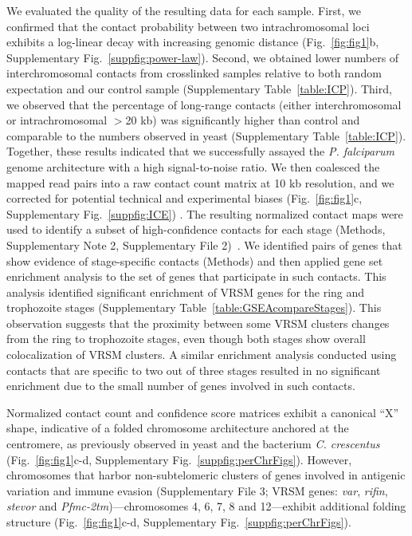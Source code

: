 We evaluated the quality of the resulting data for each sample. First, we confirmed that the contact probability between two intrachromosomal loci exhibits a log-linear decay with increasing genomic distance (Fig.~\ref{fig:fig1}b, Supplementary Fig.~\ref*{suppfig:power-law}). Second, we obtained lower numbers of interchromosomal contacts from crosslinked samples relative to both random expectation and our control sample (Supplementary Table~\ref*{table:ICP}). Third, we observed that the percentage of long-range contacts (either interchromosomal or intrachromosomal $>$20 kb) was significantly higher than control and comparable to the numbers observed in yeast \citep{duan:three} (Supplementary Table~\ref*{table:ICP}). Together, these results indicated that we successfully assayed the {\em P. falciparum} genome architecture with a high signal-to-noise ratio. We then coalesced the mapped read pairs into a raw contact count matrix at 10 kb resolution, and we corrected for potential technical and experimental biases \citep{imakaev:iterative} (Fig.~\ref{fig:fig1}c, Supplementary Fig.~\ref*{suppfig:ICE}) . The resulting normalized contact maps were used to identify a subset of high-confidence contacts for each stage (Methods, Supplementary Note 2, Supplementary File 2)~\citep{ay:statistical}. We identified pairs of genes that show evidence of stage-specific contacts (Methods) and then applied gene set enrichment analysis to the set of genes that participate in such contacts.  This analysis identified significant enrichment of VRSM genes for the ring and trophozoite stages (Supplementary Table~\ref*{table:GSEAcompareStages}). This observation suggests that the proximity between some VRSM clusters changes from the ring to trophozoite stages, even though both stages show overall colocalization of VRSM clusters. A similar enrichment analysis conducted using contacts that are specific to two out of three stages resulted in no significant enrichment due to the small number of genes involved in such contacts.

Normalized contact count and confidence score matrices exhibit a canonical ``X'' shape, indicative of a folded chromosome architecture anchored at the centromere, as previously observed in yeast \citep{duan:three, tanizawa:mapping} and the bacterium {\em C. crescentus} \citep{umbarger:three-dimensional} (Fig.~\ref{fig:fig1}c-d, Supplementary Fig.~\ref*{suppfig:perChrFigs}). However, chromosomes that harbor non-subtelomeric clusters of genes involved in antigenic variation and immune evasion (Supplementary File 3; VRSM genes: {\em var}, {\em rifin}, {\em stevor} and {\em Pfmc-2tm})---chromosomes 4, 6, 7, 8 and 12---exhibit additional folding structure (Fig.~\ref{fig:fig1}c-d, Supplementary Fig.~\ref*{suppfig:perChrFigs}).

